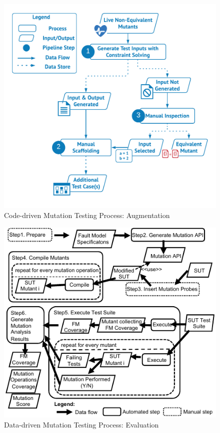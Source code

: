 \begin{figure}
	\centering
		\includegraphics[width=12cm]{images/MT2}
		\caption{Code-driven Mutation Testing Process: Augmentation}
		\label{fig:code:process_aug}
	\end{figure}



\begin{figure}
	\centering
		\includegraphics[width=12cm]{images/dataDrivenBufferProcess}
		\caption{Data-driven Mutation Testing Process: Evaluation}
		\label{fig:data:process_eva}
	\end{figure}

